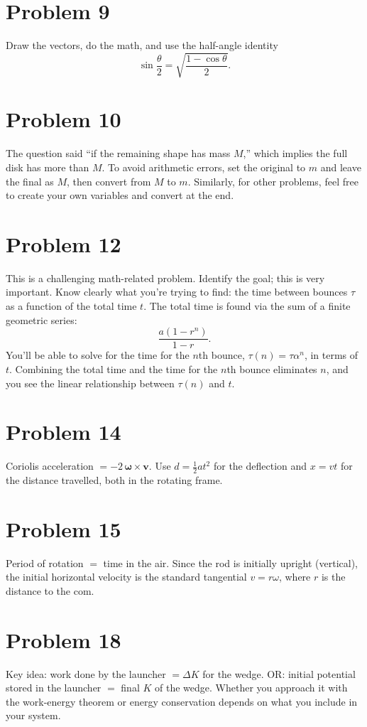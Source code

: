 \documentclass[11pt]{article}
\begin{document}
\section*{Problem 9}
Draw the vectors, do the math, and use the half-angle identity
\[
\sin\frac\theta2=\sqrt{\frac{1-\cos\theta}{2}}.
\]

\section*{Problem 10}
The question said ``if the remaining shape has mass $M$,'' which implies the full disk has more than $M$.
To avoid arithmetic errors, set the original to $m$ and leave the final as $M$, then convert from $M$ to $m$. Similarly, for other problems, feel free to create your own variables and convert at the end.

\section*{Problem 12}
This is a challenging math-related problem. Identify the goal; this is very important. Know clearly what you're trying to find: the time between bounces $\tau$ as a function of the total time $t$.
The total time is found via the sum of a finite geometric series:
\[
\frac{a(1-r^n)}{1-r}.
\]
You'll be able to solve for the time for the $n$th bounce, $\tau(n)=\tau\alpha^n$, in terms of $t$.
Combining the total time and the time for the $n$th bounce eliminates $n$, and you see the linear relationship between $\tau(n)$ and $t$.

\section*{Problem 14}
Coriolis acceleration $=-2\,\boldsymbol\omega\times\mathbf v$.
Use $d=\tfrac12at^2$ for the deflection and $x=vt$ for the distance travelled, both in the rotating frame.

\section*{Problem 15}
Period of rotation $=$ time in the air.
Since the rod is initially upright (vertical), the initial horizontal velocity is the standard tangential $v=r\omega$, where $r$ is the distance to the com.

\section*{Problem 18}
Key idea: work done by the launcher $=\Delta K$ for the wedge.
OR: initial potential stored in the launcher $=$ final $K$ of the wedge.
Whether you approach it with the work-energy theorem or energy conservation depends on what you include in your system.
\end{document}
